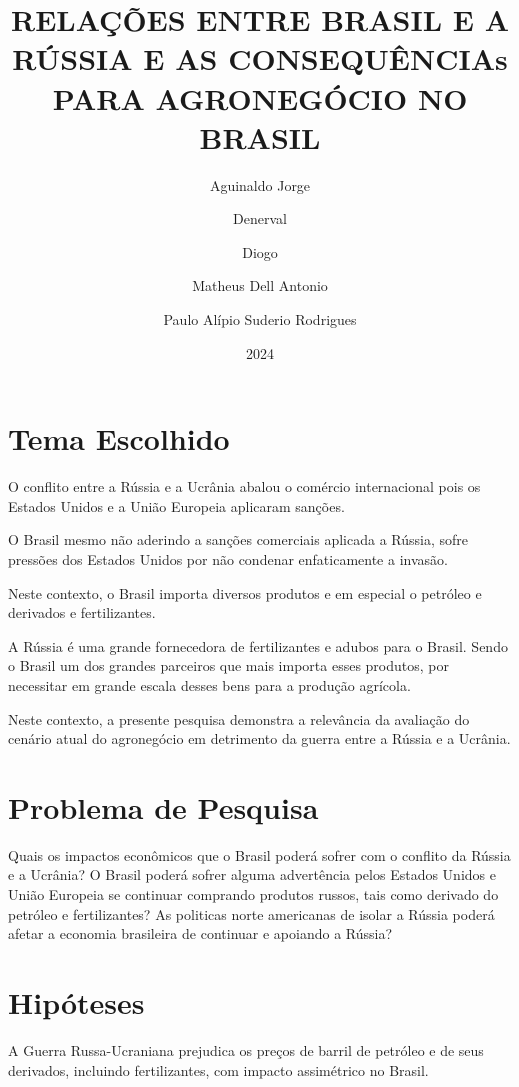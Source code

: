 \documentclass[article,12pt,oneside,a4paper,english,brazil,sumario=tradicional]{abntex2}
\author{Aguinaldo Jorge \and Denerval \and Diogo \and Matheus Dell Antonio \and Paulo Alípio Suderio Rodrigues}
\date{2024}
\title{RELAÇÕES ENTRE BRASIL E A RÚSSIA E AS CONSEQUÊNCIAs PARA AGRONEGÓCIO NO BRASIL}
\begin{document}
\maketitle
{}

\frenchspacing

\maketitle

\textual
\section*{Tema Escolhido}

O conflito entre a Rússia e a Ucrânia abalou o comércio internacional pois os Estados Unidos e a União Europeia aplicaram sanções. 

O Brasil mesmo não aderindo a sanções comerciais aplicada a Rússia, sofre pressões dos Estados Unidos por não condenar enfaticamente a invasão.

Neste contexto, o Brasil importa diversos produtos e em especial o petróleo e derivados e fertilizantes.

A Rússia é uma grande fornecedora de fertilizantes e adubos para o Brasil. Sendo o Brasil um dos grandes parceiros que mais importa esses produtos, por necessitar em grande escala desses bens para a produção agrícola.

Neste contexto, a presente pesquisa demonstra a relevância da avaliação do cenário atual do agronegócio em detrimento da guerra entre a Rússia e a Ucrânia. 

\section*{Problema de Pesquisa}

Quais os impactos econômicos que o Brasil poderá sofrer com o conflito da Rússia e a Ucrânia? O Brasil poderá sofrer alguma advertência pelos Estados Unidos e União Europeia se continuar comprando produtos russos, tais como derivado do petróleo e fertilizantes? As politicas norte americanas de isolar a Rússia poderá afetar a economia brasileira de continuar e apoiando a Rússia?

\section*{Hipóteses}

A Guerra Russa-Ucraniana prejudica os preços de barril de petróleo e de seus derivados, incluindo fertilizantes, com impacto assimétrico no Brasil.
\end{document}

